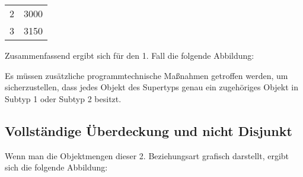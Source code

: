 
          \begin{supertabular}[h]{lp{5cm}}
            2 & 3000\\
            3 & 3150\\
          \end{supertabular}

          Zusammenfassend ergibt sich f\"ur den 1. Fall die folgende Abbildung:

          \begin{center}
          \end{center}
\vspace{\baselineskip}
          \begin{center}
          \end{center}

          \begin{merke}
            Es m\"ussen zus\"atzliche programmtechnische Ma\ss nahmen getroffen werden, um sicherzustellen, dass jedes Objekt des Supertyps genau ein zugeh\"origes Objekt in Subtyp 1 oder Subtyp 2 besitzt.
          \end{merke}
      \subsection{Vollst\"andige \"Uberdeckung und nicht Disjunkt}
        Wenn man die Objektmengen dieser 2. Beziehungsart grafisch darstellt, ergibt sich die folgende Abbildung:

